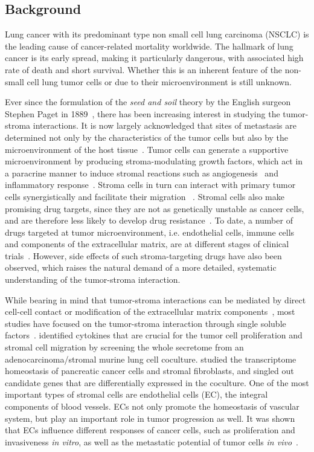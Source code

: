 \subsection{Background}
Lung cancer with its predominant type non small cell lung carcinoma 
(NSCLC) is the leading cause of cancer-related mortality worldwide.
The hallmark of lung cancer is its early spread, 
making it particularly dangerous, with associated high rate of death 
and short survival.
Whether this is an inherent feature of the non-small cell 
lung tumor cells or 
due to their microenvironment is still unknown. 

Ever since the formulation of the \emph{seed and soil} theory by the English 
surgeon Stephen Paget in 1889~\citep{Paget1889}, there has been increasing 
interest in studying the tumor-stroma interactions. 
It is now largely acknowledged that sites of metastasis are determined 
not only by the characteristics of the tumor
cells but also by the microenvironment of
the host tissue~\citep{Fidler2003}. Tumor cells can generate a supportive
microenvironment by producing stroma-modulating
growth factors, which act in a
paracrine manner to induce stromal reactions such as
angiogenesis~\citep{Bergers2003}
and inflammatory response~\citep{Coussens2002}. Stroma cells in turn can
interact with primary tumor cells synergistically and facilitate their migration~%
\citep{Wyckoff2004}.
Stromal cells also make promising drug targets, since they are not as 
genetically
unstable as cancer cells, and are therefore less likely to
develop drug resistance~\citep{Kerbel1997}. To date, a number of drugs targeted
at tumor microenvironment, i.e. endothelial cells, immune cells and components
of the extracellular matrix, are at different stages of clinical 
trials~\citep{Mueller2004}. However, side effects of such stroma-targeting drugs
have also been observed, which raises the natural demand of a more detailed, 
systematic understanding of the tumor-stroma interaction.

While bearing in mind that tumor-stroma interactions can be mediated by direct cell-cell contact or modification of the extracellular matrix
components~\citep{Micke2004a}, most studies have focused on the tumor-stroma interaction through
single soluble factors~\citep{Kryczek2007,Saijo2002i,Nakamura1997}. 
\cite{Zhong2008} identified cytokines that are crucial for the 
tumor cell proliferation
and stromal cell migration by screening the whole secretome from
an adenocarcinoma/stromal murine lung cell coculture.
\cite{Sato2004} studied
the transcriptome homeostasis of pancreatic
cancer cells and stromal fibroblasts,
and singled out candidate genes that are
differentially expressed in the coculture.
One of the most important types of stromal cells are endothelial cells (EC), 
the integral components of blood vessels. ECs not only promote the homeostasis of 
vascular system, but play an important role in tumor progression as well. 
It was shown that ECs influence different responses of cancer cells, such as 
proliferation and invasiveness \emph{in vitro}, as well as the metastatic potential 
of tumor cells \emph{in vivo}~\citep{Franses2011}.


